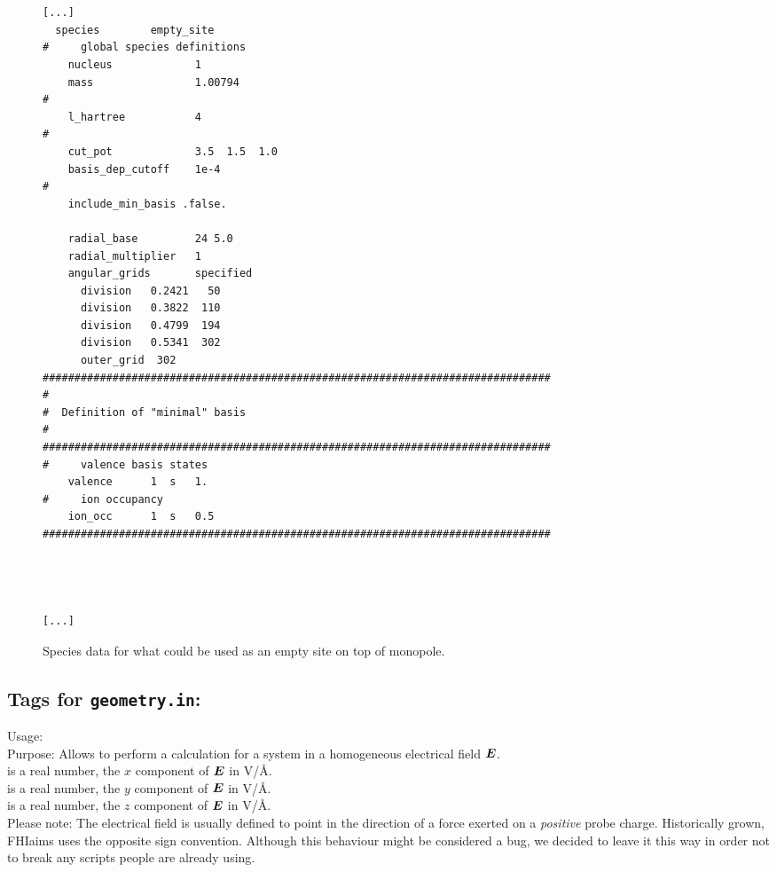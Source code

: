 \begin{figure}[hb]
  \small
  \begin{verbatim}


[...]
  species        empty_site
#     global species definitions
    nucleus             1
    mass                1.00794
#
    l_hartree           4
#
    cut_pot             3.5  1.5  1.0
    basis_dep_cutoff    1e-4
#     
    include_min_basis .false.

    radial_base         24 5.0
    radial_multiplier   1
    angular_grids       specified
      division   0.2421   50
      division   0.3822  110
      division   0.4799  194
      division   0.5341  302
      outer_grid  302
################################################################################
#
#  Definition of "minimal" basis
#
################################################################################
#     valence basis states
    valence      1  s   1.
#     ion occupancy
    ion_occ      1  s   0.5
################################################################################




[...]

  \end{verbatim}
  \normalsize

  \vspace*{-4.0ex}

  \caption{\label{Fig:empty_site_for_multipole}
Species data for what could be used as an empty site on top of monopole.
  }
\end{figure}

\newpage

\subsection*{Tags for \texttt{geometry.in}:}

{
  \noindent
  Usage:   
     \\[1.0ex]  
  Purpose: Allows to perform a calculation for a system in a
    homogeneous electrical field $\mbox{\boldmath$E$}$. \\[1.0ex]
   is a real number, the $x$ component of $\mbox{\boldmath$E$}$ in
    V/{\AA}. \\
   is a real number, the $y$ component of $\mbox{\boldmath$E$}$ in
    V/{\AA}. \\
   is a real number, the $z$ component of $\mbox{\boldmath$E$}$ in
    V/{\AA}. \\

   Please note: The electrical field is usually defined to point in the direction
   of a force exerted on a \emph{positive} probe charge. Historically grown, FHIaims
   uses the opposite sign convention. Although this behaviour might
 be considered a bug, we decided to leave it this way in order not to break any scripts
people are already using.

}

